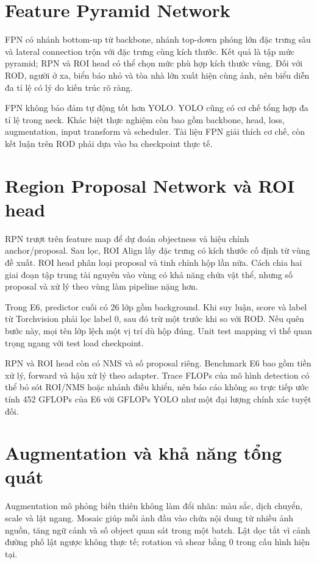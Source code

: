 \documentclass[12pt,a4paper,oneside]{report}
\begin{document}
\section{Feature Pyramid Network}
FPN có nhánh bottom-up từ backbone, nhánh top-down phóng lớn đặc trưng sâu và lateral connection trộn với đặc trưng cùng kích thước. Kết quả là tập mức pyramid; RPN và ROI head có thể chọn mức phù hợp kích thước vùng. Đối với ROD, người ở xa, biển báo nhỏ và tòa nhà lớn xuất hiện cùng ảnh, nên biểu diễn đa tỉ lệ có lý do kiến trúc rõ ràng.

FPN không bảo đảm tự động tốt hơn YOLO. YOLO cũng có cơ chế tổng hợp đa tỉ lệ trong neck. Khác biệt thực nghiệm còn bao gồm backbone, head, loss, augmentation, input transform và scheduler. Tài liệu FPN giải thích cơ chế, còn kết luận trên ROD phải dựa vào ba checkpoint thực tế.

\section{Region Proposal Network và ROI head}
RPN trượt trên feature map để dự đoán objectness và hiệu chỉnh anchor/proposal. Sau lọc, ROI Align lấy đặc trưng có kích thước cố định từ vùng đề xuất. ROI head phân loại proposal và tinh chỉnh hộp lần nữa. Cách chia hai giai đoạn tập trung tài nguyên vào vùng có khả năng chứa vật thể, nhưng số proposal và xử lý theo vùng làm pipeline nặng hơn.

Trong E6, predictor cuối có 26 lớp gồm background. Khi suy luận, score và label từ Torchvision phải lọc label 0, sau đó trừ một trước khi so với ROD. Nếu quên bước này, mọi tên lớp lệch một vị trí dù hộp đúng. Unit test mapping vì thế quan trọng ngang với test load checkpoint.

RPN và ROI head còn có NMS và số proposal riêng. Benchmark E6 bao gồm tiền xử lý, forward và hậu xử lý theo adapter. Trace FLOPs của mô hình detection có thể bỏ sót ROI/NMS hoặc nhánh điều khiển, nên báo cáo không so trực tiếp ước tính 452 GFLOPs của E6 với GFLOPs YOLO như một đại lượng chính xác tuyệt đối.

\section{Augmentation và khả năng tổng quát}
Augmentation mô phỏng biến thiên không làm đổi nhãn: màu sắc, dịch chuyển, scale và lật ngang. Mosaic giúp mỗi ảnh đầu vào chứa nội dung từ nhiều ảnh nguồn, tăng ngữ cảnh và số object quan sát trong một batch. Lật dọc tắt vì cảnh đường phố lật ngược không thực tế; rotation và shear bằng 0 trong cấu hình hiện tại.
\end{document}
